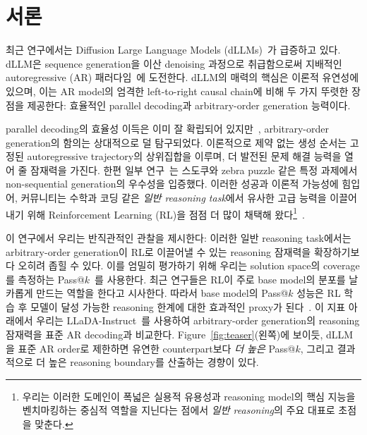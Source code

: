 \section{서론}
\label{sec:intro}

최근 연구에서는 Diffusion Large Language Models (dLLMs)~\cite{nie2025large,ye2025dream,zhu2025llada,zhao2025d1,labs2025mercury}가 급증하고 있다. dLLM은 sequence generation을 이산 denoising 과정으로 취급함으로써 지배적인 autoregressive (AR) 패러다임~\cite{brown2020language,achiam2023gpt}에 도전한다.
dLLM의 매력의 핵심은 이론적 유연성에 있으며, 이는 AR model의 엄격한 left-to-right causal chain에 비해 두 가지 뚜렷한 장점을 제공한다: 효율적인 parallel decoding과 arbitrary-order generation 능력이다.

parallel decoding의 효율성 이득은 이미 잘 확립되어 있지만~\cite{fastdllm,labs2025mercury,geminidiffusion,song2025seed,wu2025fast}, arbitrary-order generation의 함의는 상대적으로 덜 탐구되었다.
이론적으로 제약 없는 생성 순서는 고정된 autoregressive trajectory의 상위집합을 이루며, 더 발전된 문제 해결 능력을 열어 줄 잠재력을 가진다.
한편 일부 연구~\cite{ye2024beyond,kim2025train}는 스도쿠와 zebra puzzle 같은 특정 과제에서 non-sequential generation의 우수성을 입증했다.
이러한 성공과 이론적 가능성에 힘입어, 커뮤니티는 수학과 코딩 같은 \emph{일반 reasoning task}에서 유사한 고급 능력을 이끌어내기 위해 Reinforcement Learning (RL)을 점점 더 많이 채택해 왔다\footnote{
    우리는 이러한 도메인이 폭넓은 실용적 유용성과 reasoning model의 핵심 지능을 벤치마킹하는 중심적 역할을 지닌다는 점에서 \emph{일반 reasoning}의 주요 대표로 초점을 맞춘다.
    }~\cite{zhao2025d1,wang2025spg,gong2025diffucoder,rojas2025improving,ou2025principled}.

이 연구에서 우리는 반직관적인 관찰을 제시한다: 이러한 일반 reasoning task에서는 arbitrary-order generation이 RL로 이끌어낼 수 있는 reasoning 잠재력을 확장하기보다 오히려 좁힐 수 있다.
이를 엄밀히 평가하기 위해 우리는 solution space의 coverage를 측정하는 Pass@$k$~\cite{chen2021evaluating}를 사용한다.
최근 연구들은 RL이 주로 base model의 분포를 날카롭게 만드는 역할을 한다고 시사한다. 따라서 base model의 Pass@$k$ 성능은 RL 학습 후 모델이 달성 가능한 reasoning 한계에 대한 효과적인 proxy가 된다~\cite{yue2025does,liu2025prorl}.
이 지표 아래에서 우리는 LLaDA-Instruct~\cite{nie2025large}를 사용하여 arbitrary-order generation의 reasoning 잠재력을 표준 AR decoding과 비교한다.
Figure~\ref{fig:teaser}(왼쪽)에 보이듯, dLLM을 표준 AR order로 제한하면 유연한 counterpart보다 \emph{더 높은} Pass@$k$, 그리고 결과적으로 더 높은 reasoning boundary를 산출하는 경향이 있다.

